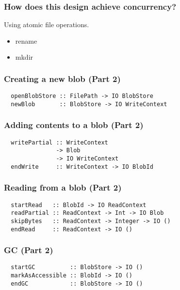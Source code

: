 \documentclass[10pt]{beamer}
\begin{document}
\begin{frame}
  \frametitle{How does this design achieve concurrency?}
  \pause
  Using atomic file operations.
  \pause
  \begin{itemize}[<+->]
    \item rename
    \item mkdir
  \end{itemize}
  \vspace{1cm}
\end{frame}
\begin{frame}[fragile]
  \frametitle{Creating a new blob (Part 2)}
  \begin{verbatim}
  openBlobStore :: FilePath -> IO BlobStore
  newBlob       :: BlobStore -> IO WriteContext
  \end{verbatim}
  \vspace{1cm}
  \small
\end{frame}

\begin{frame}[fragile]
  \frametitle{Adding contents to a blob (Part 2)}
  \begin{verbatim}
  writePartial :: WriteContext
               -> Blob
               -> IO WriteContext
  endWrite     :: WriteContext -> IO BlobId
  \end{verbatim}
  \vspace{1cm}
  \small
\end{frame}

\begin{frame}[fragile]
  \frametitle{Reading from a blob (Part 2)}
  \begin{verbatim}
  startRead   :: BlobId -> IO ReadContext
  readPartial :: ReadContext -> Int -> IO Blob
  skipBytes   :: ReadContext -> Integer -> IO ()
  endRead     :: ReadContext -> IO ()
  \end{verbatim}
\end{frame}

\begin{frame}[fragile]
  \frametitle{GC (Part 2)}
  \begin{verbatim}
  startGC          :: BlobStore -> IO ()
  markAsAccessible :: BlobId -> IO ()
  endGC            :: BlobStore -> IO ()
  \end{verbatim}
  \vspace{0.5cm}
  \tiny
\end{frame}
\end{document}
